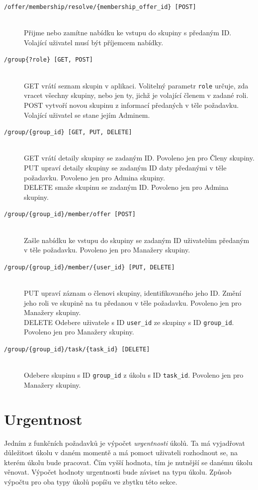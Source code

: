 \documentclass[thesis=B,czech]{FITthesis}[2012/06/26]
\newcommand{\foradmin}{Povoleno jen pro Admina skupiny.}
\newcommand{\formanagers}{Povoleno jen pro Manažery skupiny.}
\newcommand{\formembers}{Povoleno jen pro Členy skupiny.}
\begin{document}
\begin{description}
			\item[\texttt{/offer/membership/resolve/\{membership\_offer\_id\} [POST]}] \hfill \\
				Přijme nebo zamítne nabídku ke vstupu do skupiny s předaným ID.  Volající uživatel musí být příjemcem nabídky.
			
			\item[\texttt{/group\{?role\} [GET, POST]}] \hfill \\
				GET vrátí seznam skupin v aplikaci. Volitelný parametr \texttt{role} určuje, zda vracet všechny skupiny, nebo jen ty, jichž je volající členem v zadané roli. \\
				POST vytvoří novou skupinu z informací předaných v těle požadavku. Volající uživatel se stane jejím Adminem.
			
			\item[\texttt{/group/\{group\_id\} [GET, PUT, DELETE]}] \hfill \\
				GET vrátí detaily skupiny se zadaným ID. \formembers \\
				PUT upraví detaily skupiny se zadaným ID daty předanými v těle požadavku. \foradmin \\
				DELETE smaže skupinu se zadaným ID. \foradmin 

			\item[\texttt{/group/\{group\_id\}/member/offer [POST]}] \hfill \\
				Zašle nabídku ke vstupu do skupiny se zadaným ID uživatelům předaným v těle požadavku. \formanagers

			\item[\texttt{/group/\{group\_id\}/member/\{user\_id\} [PUT, DELETE]}] \hfill \\
				PUT upraví záznam o členovi skupiny, identifikovaného jeho ID. Změní jeho roli ve skupině na tu předanou v těle požadavku. \formanagers \\
				DELETE Odebere uživatele s ID \texttt{user\_id} ze skupiny s ID \texttt{group\_id}. \formanagers
			
			\item[\texttt{/group/\{group\_id\}/task/\{task\_id\} [DELETE]}] \hfill \\
				Odebere skupinu s ID \texttt{group\_id} z úkolu s ID \texttt{task\_id}. \formanagers
		

			\end{description}
			
			
	\section{Urgentnost}
		Jedním z funkčních požadavků je výpočet \textit{urgentnosti} úkolů. Ta má vyjadřovat důležitost úkolu v daném momentě a má pomoct uživateli rozhodnout se, na kterém úkolu bude pracovat. Čím vyšší hodnota, tím je nutnější se danému úkolu věnovat. Výpočet hodnoty urgentnosti bude záviset na typu úkolu. Způsob výpočtu pro oba typy úkolů popíšu ve zbytku této sekce.
		
\end{document}
